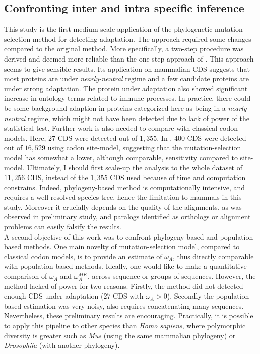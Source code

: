 \subsection{Confronting inter and intra specific inference}

This study is the first medium-scale application of the phylogenetic mutation-selection method for detecting adaptation. The approach required some changes compared to the original method. More specifically, a two-step procedure was derived and deemed more reliable than the one-step approach of \citet{Lartillot2013}. This approach seems to give sensible results. Its application on mammalian CDS suggests that most proteins are under \textit{nearly-neutral} regime and a few candidate proteins are under strong adaptation. The protein under adaptation also showed significant increase in ontology terms related to immune processes. In practice, there could be some background adaption in proteins categorized here as being in a \textit{nearly-neutral} regime, which might not have been detected due to lack of power of the statistical test. Further work is also needed to compare with classical \gls{codon} models. Here, $27$ CDS were detected out of $1,355$. In \citet{kosiol_patterns_2008}, $400$ CDS were detected out of $16,529$ using \gls{codon} site-model, suggesting that the mutation-selection model has somewhat a lower, although comparable, sensitivity compared to site-model. Ultimately, I should first scale-up the analysis to the whole dataset of $11,256$ CDS, instead of the $1,355$ CDS used because of time and computation constrains. Indeed, phylogeny-based method is computationally intensive, and requires a well resolved species tree, hence the limitation to mammals in this study. Moreover it crucially depends on the quality of the alignments, as was observed in preliminary study, and paralogs identified as orthologs or alignment problems can easily falsify the results.\\

A second objective of this work was to confront phylogeny-based and population-based methods. One main novelty of mutation-selection model, compared to classical \gls{codon} models, is to provide an estimate of $\omega_A$, thus directly comparable with population-based methods. Ideally, one would like to make a quantitative comparison of $\omega_A$ and $\omega_A^{MK}$, across sequence or groups of sequences. However, the method lacked of power for two reasons. Firstly, the method did not detected enough CDS under adaptation ($27$ CDS with $\omega_A > 0$). Secondly the population-based estimation was very noisy, also requires concatenating many sequences. Nevertheless, these preliminary results are encouraging. Practically, it is possible to apply this pipeline to other species than \textit{Homo sapiens}, where \gls{polymorphic} diversity is greater such as \textit{Mus} (using the same mammalian phylogeny) or \textit{Drosophila} (with another phylogeny). \\

